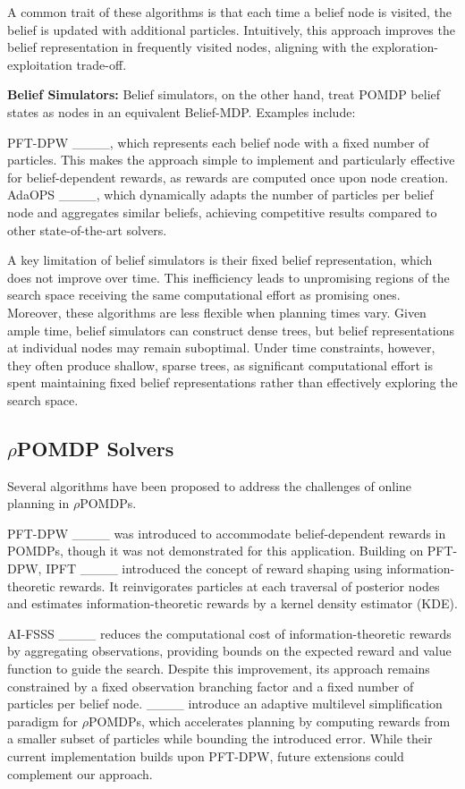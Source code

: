 		A common trait of these algorithms is that each time a belief node is visited, the belief is updated with additional particles. 
		Intuitively, this approach improves the belief representation in frequently visited nodes, aligning with the exploration-exploitation trade-off.

		\textbf{Belief Simulators:}  
		Belief simulators, on the other hand, treat POMDP belief states as nodes in an equivalent Belief-MDP. Examples include:  

		PFT-DPW ____, which represents each belief node with a fixed number of particles. This makes the approach simple to implement and particularly effective for belief-dependent rewards, as rewards are computed once upon node creation.  
		AdaOPS ____, which dynamically adapts the number of particles per belief node and aggregates similar beliefs, achieving competitive results compared to other state-of-the-art solvers.

		A key limitation of belief simulators is their fixed belief representation, which does not improve over time. This inefficiency leads to unpromising regions of the search space receiving the same computational effort as promising ones. 
		Moreover, these algorithms are less flexible when planning times vary.  Given ample time, belief simulators can construct dense trees, but belief representations at individual nodes may remain suboptimal. 
		Under time constraints, however, they often produce shallow, sparse trees, as significant computational effort is spent maintaining fixed belief representations rather than effectively exploring the search space.
				
\subsection{$\rho$POMDP Solvers}

	Several algorithms have been proposed to address the challenges of online planning in $\rho$POMDPs.

	PFT-DPW ____ was introduced to accommodate belief-dependent rewards in POMDPs, though it was not demonstrated for this application. 
	Building on PFT-DPW, IPFT ____ introduced the concept of reward shaping using information-theoretic rewards. It reinvigorates particles at each traversal of posterior nodes and estimates information-theoretic rewards by a kernel density estimator (KDE).
	
	AI-FSSS ____ reduces the computational cost of information-theoretic rewards by aggregating observations, providing bounds on the expected reward and value function to guide the search. Despite this improvement, its approach remains constrained by a fixed observation branching factor and a fixed number of particles per belief node. 
	____ introduce an adaptive multilevel simplification paradigm for $\rho$POMDPs, which accelerates planning by computing rewards from a smaller subset of particles while bounding the introduced error. While their current implementation builds upon PFT-DPW, future extensions could complement our approach.
	
